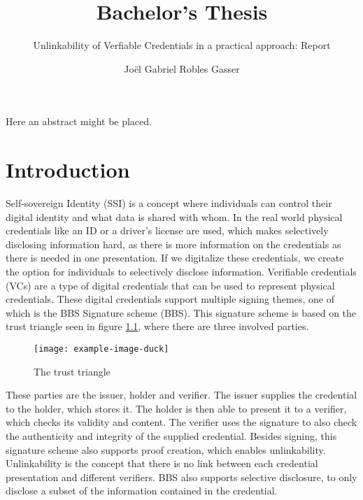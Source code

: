\documentclass[
	a4paper               %
	,bibliography=totoc   %
	,listof=totoc         %
	,monolingual
]{bfhthesis}              %
\begin{document}
\frontmatter

\title{Bachelor's Thesis}
\subtitle{Unlinkability of Verfiable Credentials in a practical approach: Report}
\author{Joël Gabriel Robles Gasser}

\maketitle

Here an abstract might be placed.


\tableofcontents

\mainmatter

\chapter{Introduction}
Self-sovereign Identity (SSI)\cite{self-sovereign-identity} is a concept where individuals can control their digital identity and what data is shared with whom.
In the real world physical credentials like an ID or a driver's license are used, which makes selectively disclosing information hard, as there is more information on the credentials as there is needed in one presentation.
If we digitalize these credentials, we create the option for individuals to selectively disclose information. 
Verifiable credentials (VCs)\cite{verifiable-credentials} are a type of digital credentials that can be used to represent physical credentials.
These digital credentials support multiple signing themes, one of which is the BBS Signature scheme (BBS)\cite{bbs-signature-scheme}.
This signature scheme is based on the trust triangle seen in figure \ref{fig:trusttringle}, where there are three involved parties.

\begin{figure}[h]
	\centering
	\texttt{[image: example-image-duck]}
	\caption{The trust triangle}
	\label{fig:trusttringle}
\end{figure}

These parties are the issuer, holder and verifier.
The issuer supplies the credential to the holder, which stores it. The holder is then able to present it to a verifier, which checks its validity and content.
The verifier uses the signature to also check the authenticity and integrity of the supplied credential.
Besides signing, this signature scheme also supports proof creation, which enables unlinkability.
Unlinkability is the concept that there is no link between each credential presentation and different verifiers.
BBS also supports selective disclosure, to only disclose a subset of the information contained in the credential.\\
\end{document}
